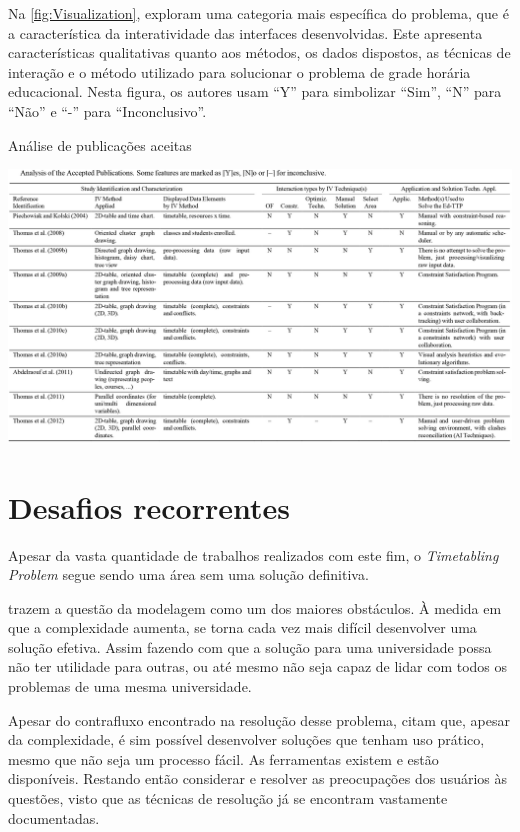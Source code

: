 Na \autoref{fig:Visualization},  exploram uma categoria mais específica do problema, que é a característica da interatividade das interfaces desenvolvidas. Este apresenta características qualitativas quanto aos métodos, os dados dispostos, as técnicas de interação e o método utilizado para solucionar o problema de grade horária educacional. Nesta figura, os autores usam ``Y'' para simbolizar ``Sim'', ``N'' para ``Não'' e ``-'' para ``Inconclusivo''.

\begin{CenteredFigure} \caption{Análise de publicações aceitas} \label{fig:Visualization}
  \includegraphics[width=\textwidth]{files/img/2.02!2-contexto/Visualization}
\end{CenteredFigure}    %

\section{Desafios recorrentes} \label{sec:desafios}           %

Apesar da vasta quantidade de trabalhos realizados com este fim, o \textit{Timetabling Problem} segue sendo uma área sem uma solução definitiva.

 trazem a questão da modelagem como um dos maiores obstáculos. À medida em que a complexidade aumenta, se torna cada vez mais difícil desenvolver uma solução efetiva. Assim fazendo com que a solução para uma universidade possa não ter utilidade para outras, ou até mesmo não seja capaz de lidar com todos os problemas de uma mesma universidade.

Apesar do contrafluxo encontrado na resolução desse problema,  citam que, apesar da complexidade, é sim possível desenvolver soluções que tenham uso prático, mesmo que não seja um processo fácil. As ferramentas existem e estão disponíveis. Restando então considerar e resolver as preocupações dos usuários às questões, visto que as técnicas de resolução já se encontram vastamente documentadas.

